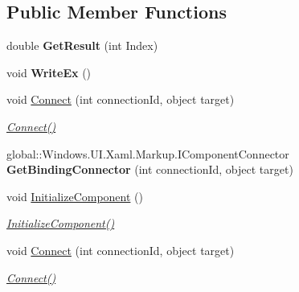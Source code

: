 \subsection*{Public Member Functions}
\begin{DoxyCompactItemize}
\item 
\mbox{\label{class_i_v_s_calc_1_1_main_page_ab9171050929ce393df8ba842c146fb99}} 
double {\bfseries Get\+Result} (int Index)
\item 
\mbox{\label{class_i_v_s_calc_1_1_main_page_a0dda07e5989cd02a7c341334e1704330}} 
void {\bfseries Write\+Ex} ()
\item 
void \hyperlink{class_i_v_s_calc_1_1_main_page_a36a7263a9c76a6fdfa392266c3b56122}{Connect} (int connection\+Id, object target)
\begin{DoxyCompactList}\small\item\em \hyperlink{class_i_v_s_calc_1_1_main_page_a36a7263a9c76a6fdfa392266c3b56122}{Connect()} \end{DoxyCompactList}\item 
\mbox{\label{class_i_v_s_calc_1_1_main_page_a1ed5d92cf49cffc51dd1dc959a933f7a}} 
global\+::\+Windows.\+U\+I.\+Xaml.\+Markup.\+I\+Component\+Connector {\bfseries Get\+Binding\+Connector} (int connection\+Id, object target)
\item 
void \hyperlink{class_i_v_s_calc_1_1_main_page_a82228985b36d2c45b809d7b2ba489aef}{Initialize\+Component} ()
\begin{DoxyCompactList}\small\item\em \hyperlink{class_i_v_s_calc_1_1_main_page_a82228985b36d2c45b809d7b2ba489aef}{Initialize\+Component()} \end{DoxyCompactList}\item 
void \hyperlink{class_i_v_s_calc_1_1_main_page_a36a7263a9c76a6fdfa392266c3b56122}{Connect} (int connection\+Id, object target)
\begin{DoxyCompactList}\small\item\em \hyperlink{class_i_v_s_calc_1_1_main_page_a36a7263a9c76a6fdfa392266c3b56122}{Connect()} \end{DoxyCompactList}\item 
\mbox{\label{class_i_v_s_calc_1_1_main_page_a1ed5d92cf49cffc51dd1dc959a933f7a}} 

\end{DoxyCompactItemize}
